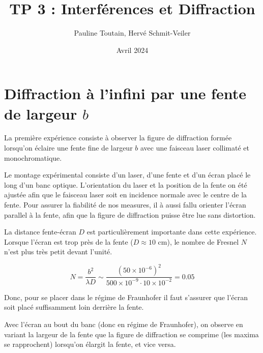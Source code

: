 \documentclass{article}
\title{TP 3 : Interférences et Diffraction}
\author{Pauline Toutain, Hervé Schmit-Veiler}
\date{Avril 2024}
\begin{document}
\maketitle

\section{Diffraction à l'infini par une fente de largeur $b$}
\label{sec:diffraction}

La première expérience consiste à observer la figure de diffraction formée lorsqu'on 
éclaire une fente fine de largeur $b$ avec une faisceau laser collimaté et monochromatique.

Le montage expérimental consiste d'un laser, d'une fente et d'un écran placé le long d'un banc optique.
L'orientation du laser et la position de la fente on été ajustée afin que le faisceau laser soit en incidence normale avec 
le centre de la fente. Pour assurer la fiabilité de nos measures, 
il à aussi fallu orienter l'écran parallel à la fente, afin que la figure de diffraction puisse être lue sans 
distortion.

La distance fente-écran $D$ est particulièrement importante dans cette expérience. 
Lorsque l'écran est trop près de la fente ($D \approx 10 \text{ cm}$), 
le nombre de Fresnel $N$ n'est plus très petit devant l'unité. 

$$N = \frac{b^2}{\lambda D} \sim \frac{(50\times10^{-6})^2}{500\times10^{-9} \cdot 10\times10^{-2}} = 0.05$$

Donc, pour se placer dans le régime de Fraunhofer 
il faut s'assurer que l'écran soit placé suffisamment loin derrière la fente.

Avec l'écran au bout du banc (donc en régime de Fraunhofer), on observe en variant 
la largeur de la fente que la figure de diffraction se comprime 
(les maxima se rapprochent) lorsqu'on élargit la fente, et vice versa.
  
\end{document}
